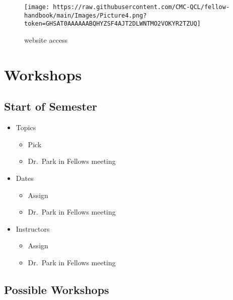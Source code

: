 \documentclass[
]{book}
\providecommand{\tightlist}{%
  \setlength{\itemsep}{0pt}\setlength{\parskip}{0pt}}
\begin{document}
\begin{figure}
\centering
\texttt{[image: https://raw.githubusercontent.com/CMC-QCL/fellow-handbook/main/Images/Picture4.png?token=GHSAT0AAAAAABQHYZSF4AJT2DLWNTMO2VOKYR2TZUQ]}
\caption{website access}
\end{figure}

\hypertarget{workshops}{%
\chapter{Workshops}\label{workshops}}

\hypertarget{start-of-semester}{%
\section{Start of Semester}\label{start-of-semester}}

\begin{itemize}
\tightlist
\item
  Topics

  \begin{itemize}
  \tightlist
  \item
    Pick
  \item
    Dr.~Park in Fellows meeting
  \end{itemize}
\item
  Dates

  \begin{itemize}
  \tightlist
  \item
    Assign
  \item
    Dr.~Park in Fellows meeting
  \end{itemize}
\item
  Instructors

  \begin{itemize}
  \tightlist
  \item
    Assign
  \item
    Dr.~Park in Fellows meeting
  \end{itemize}
\end{itemize}

\hypertarget{possible-workshops}{%
\section{Possible Workshops}\label{possible-workshops}}
\end{document}
